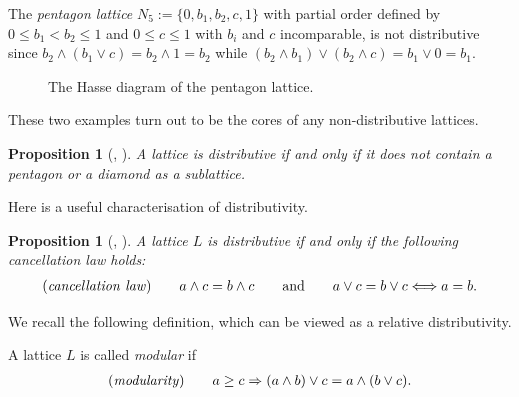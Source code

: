 \documentclass[10pt,a4paper]{amsart}
\numberwithin{equation}{section}
\newtheorem{Proposition}[Theorem]{Proposition}
\begin{document}
\begin{Example}\label{ex:pentagon}
 The {\it pentagon lattice} $N_5:=\{0,b_1,b_2,c,1\}$ with partial order defined by
$0\leq b_1< b_2\leq1$ and $0\leq c\leq 1$ with $b_i$ and $c$ incomparable, is not distributive since $b_2\wedge (b_1\vee c)=b_2\wedge 1=b_2$ while $(b_2\wedge b_1)\vee(b_2\wedge c)=b_1\vee 0=b_1$.
\begin{figure}[h!]\centering
{}
\caption{The Hasse diagram of the pentagon lattice.}
\end{figure}
\end{Example}

These two examples turn out to be the cores of any non-distributive lattices.

\begin{Proposition}[{\cite[Chapter~IX, Theorem~2]{B}, \cite[Theorems~101 and 102]{Gra1}}]\label{prop:charnondist}
A lattice is distributive if and only if it does not contain a pentagon or a diamond as a sublattice.
\end{Proposition}

Here is a useful characterisation of distributivity.
\begin{Proposition}[{\cite[Theorem~I.10]{B}, \cite[Corollary~3.1.3]{PR}}]%
A lattice $L$ is distributive if and only if the following {\it cancellation law} holds:
\begin{gather*}%
({\it cancellation\ law})\qquad a\wedge c= b\wedge c\qquad {\rm and}\qquad a\vee c= b\vee c \Longleftrightarrow a=b.
\end{gather*}
 \end{Proposition}


We recall the following definition, which can be viewed as a relative distributivity.

\begin{Definition} \label{defn:modularlattice}
A lattice $L$ is called {\it modular} if
\begin{gather*}
({\it modularity})\qquad 	a\geq c \Rightarrow (a\wedge b)\vee c= a \wedge (b\vee c).
\end{gather*}
\end{Definition}
\end{document}
